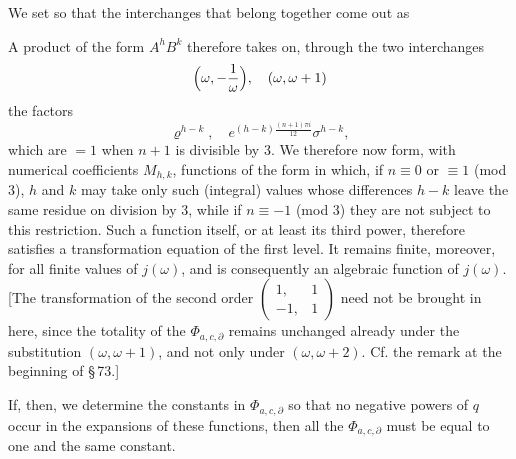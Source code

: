 We set
so that the interchanges that belong together come out as

A product of the form $A^h B^k$ therefore takes on, through the two interchanges
\[
\Bigl(\omega, -\frac{1}{\omega}\Bigr), \quad (\omega, \omega+1)
\]
the factors
\[
\varrho^{h-k}, \quad e^{(h-k)\frac{(n+1)\pi i}{12}}\sigma^{h-k},
\]
which are $=1$ when $n+1$ is divisible by 3. We therefore now form, with numerical coefficients $M_{h,k}$, functions of the form
in which, if $n \equiv 0$ or $\equiv 1$ (mod 3), $h$ and $k$ may take only such (integral) values whose differences $h-k$ leave the same residue on division by 3, while if $n \equiv -1$ (mod 3) they are not subject to this restriction. Such a function itself, or at least its third power, therefore satisfies a transformation equation of the first level. It remains finite, moreover, for all finite values of $j(\omega)$, and is consequently an  algebraic function of $j(\omega)$. [The transformation of the second order $\begin{pmatrix} 1, & 1\\ -1, & 1 \end{pmatrix}$ need not be brought in here, since the totality of the $\Phi_{a,c,\partial}$ remains unchanged already under the substitution $(\omega, \omega+1)$, and not only under $(\omega, \omega+2)$. Cf. the remark at the beginning of §\,73.]

If, then, we determine the constants in $\Phi_{a,c,\partial}$ so that no negative powers of $q$ occur in the expansions of these functions, then all the $\Phi_{a,c,\partial}$ must be equal to one and the same constant.
